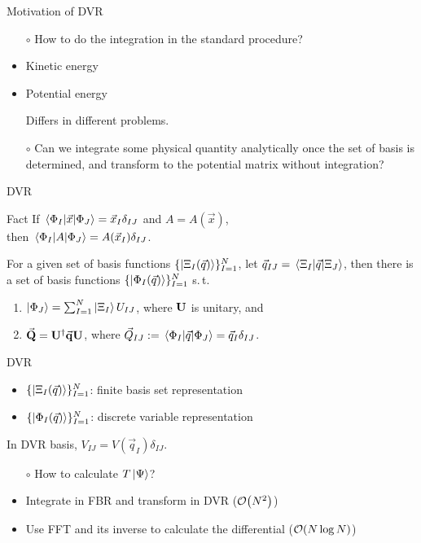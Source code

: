 \documentclass[12pt]{beamer}
\begin{document}
    \begin{frame}{Motivation of DVR}
        \begin{itemize}
            \item[$\circ$] How to do the integration in the standard procedure?
            \item Kinetic energy
            \item Potential energy

            Differs in different problems.
            \item[$\circ$] Can we integrate some physical quantity analytically once the set of basis is determined, and transform to the potential matrix without integration?
        \end{itemize} 
    \end{frame}

    \begin{frame}{DVR}
        \begin{block}{Fact}
            If $\mel{\Phi_I}{\vec{x}}{\Phi_J} = \vec{x}_I\delta_{IJ}$ and $A = A(\vec{x})$,\\
            then $\mel{\Phi_I}{A}{\Phi_J} = A(\vec{x}_I)\delta_{IJ}$.
        \end{block}
        For a given set of basis functions $\{ \ket{\Xi_I(\vec{q})} \}_{I=1}^N$, let $\vec{q}_{IJ} = \mel{\Xi_I}{\vec{q}}{\Xi_J}$, then there is a set of basis functions $\{ \ket{\Phi_I(\vec{q})} \}_{I=1}^N$ s.\,t.\, 
        \begin{enumerate}
            \item $\ket{\Phi_J} = \sum_{I=1}^N \ket{\Xi_I} U_{IJ}$, where $\vb{U}$ is unitary, and
            \item $\va{Q} = \vb{U}^\dagger \va{q} \vb{U}$, where $\vec{Q}_{IJ} := \mel{\Phi_I}{\vec{q}}{\Phi_J} = \vec{q}_I\delta_{IJ}$.
        \end{enumerate}
    \end{frame}

    \begin{frame}{DVR}
        \begin{itemize}
            \item $\{ \ket{\Xi_I(\vec{q})} \}_{I=1}^N$: finite basis set representation
            \item $\{ \ket{\Phi_I(\vec{q})} \}_{I=1}^N$: discrete variable representation
        \end{itemize}
        In DVR basis, $V_{IJ} = V(\vec{q}_I)\delta_{IJ}$.
        \begin{itemize}
            \item[$\circ$] How to calculate $T\ket{\Psi}$?
            \item Integrate in FBR and transform in DVR ($\order{N^2}$)
            \item Use FFT and its inverse to calculate the differential ($\order{N \log{N}}$)
        \end{itemize}
    \end{frame}
\end{document}
